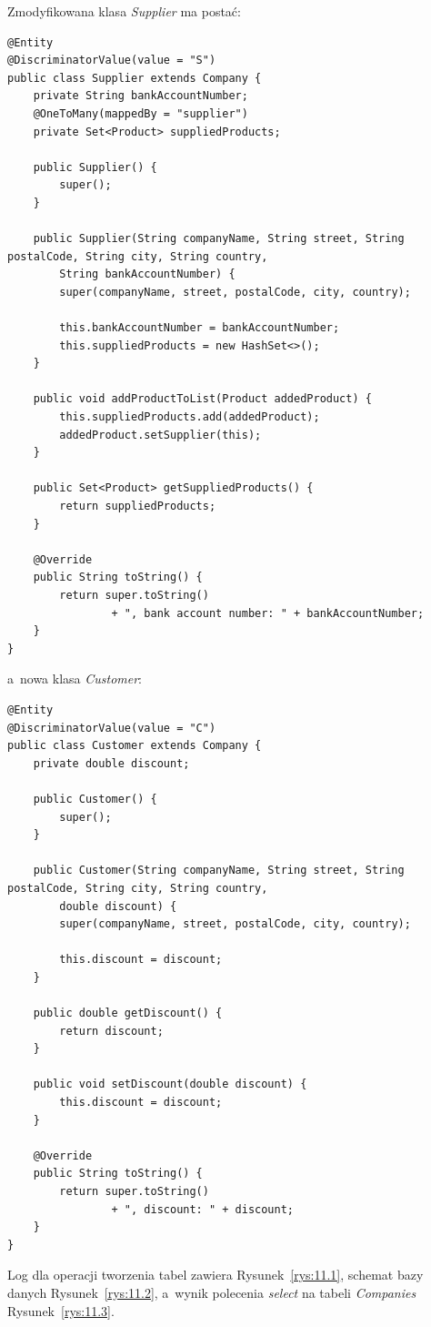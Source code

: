 \documentclass[12pt, a4paper]{mwart}
\begin{document}
Zmodyfikowana klasa \textit{Supplier} ma postać:
\begin{lstlisting}
@Entity
@DiscriminatorValue(value = "S")
public class Supplier extends Company {
    private String bankAccountNumber;
    @OneToMany(mappedBy = "supplier")
    private Set<Product> suppliedProducts;

    public Supplier() {
        super();
    }

    public Supplier(String companyName, String street, String postalCode, String city, String country, 
    	String bankAccountNumber) {
        super(companyName, street, postalCode, city, country);

        this.bankAccountNumber = bankAccountNumber;
        this.suppliedProducts = new HashSet<>();
    }

    public void addProductToList(Product addedProduct) {
        this.suppliedProducts.add(addedProduct);
        addedProduct.setSupplier(this);
    }

    public Set<Product> getSuppliedProducts() {
        return suppliedProducts;
    }
    
    @Override
    public String toString() {
        return super.toString() 
                + ", bank account number: " + bankAccountNumber;
    }
}
\end{lstlisting}

a~nowa klasa \textit{Customer}:
\begin{lstlisting}
@Entity
@DiscriminatorValue(value = "C")
public class Customer extends Company {
    private double discount;

    public Customer() {
        super();
    }

    public Customer(String companyName, String street, String postalCode, String city, String country, 
    	double discount) {
        super(companyName, street, postalCode, city, country);

        this.discount = discount;
    }

    public double getDiscount() {
        return discount;
    }

    public void setDiscount(double discount) {
        this.discount = discount;
    }
    
    @Override
    public String toString() {
        return super.toString()
                + ", discount: " + discount;
    }
}
\end{lstlisting}

Log dla operacji tworzenia tabel zawiera Rysunek~\ref{rys:11.1}, schemat bazy danych Rysunek~\ref{rys:11.2}, a~wynik polecenia \textit{select} na tabeli \textit{Companies} Rysunek~\ref{rys:11.3}.
\end{document}
